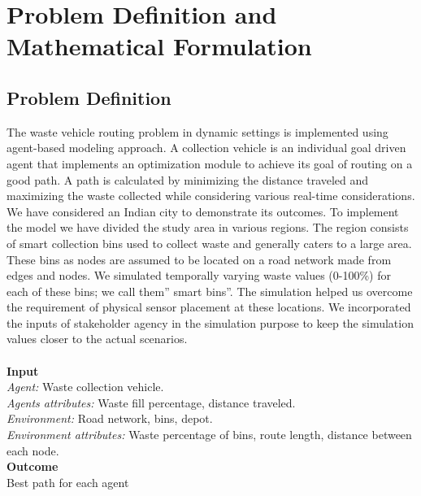 \documentclass[12pt]{article}
\begin{document}
\section{Problem Definition and Mathematical Formulation}


\subsection{Problem Definition}
The waste vehicle routing problem in dynamic settings is implemented using agent-based modeling approach. A collection vehicle is an individual goal driven agent that implements an optimization module to achieve its goal of routing on a good path. A path is calculated by minimizing the distance traveled and maximizing the waste collected while considering various real-time considerations. We have considered an Indian city to demonstrate its outcomes. To implement the model we have divided the study area in various regions. The region consists of smart collection bins used to collect waste and generally caters to a large area. These bins as nodes are assumed to be located on a road network made from edges and nodes. We simulated temporally varying waste values (0-100\%) for each of these bins; we call them” smart bins”. The simulation helped us overcome the requirement of physical sensor placement at these locations. We incorporated the inputs of stakeholder agency in the simulation purpose to keep the simulation values closer to the actual scenarios.\\
\\
\textbf {Input}\\
\textit {Agent:} Waste collection vehicle.\\
\textit {Agents attributes:} Waste fill percentage, distance traveled.  \\
\textit {Environment:} Road network, bins, depot.  \\
\textit {Environment attributes:} Waste percentage of bins, route length, distance between each node.\\
\textbf{Outcome}\\
Best path for each agent\\
\end{document}
